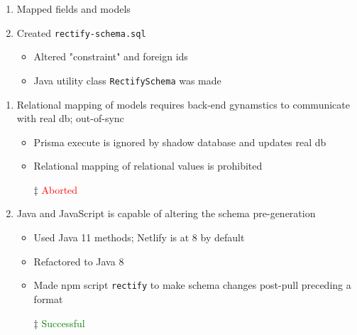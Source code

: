 \documentclass[7px]{article}
\begin{document}
\deploy
{
  \begin{enumerate}
    \item Mapped fields and models
    \item Created \texttt{rectify-schema.sql}
      \begin{itemize}
        \item Altered "constraint" and foreign ids
        \item Java utility class \texttt{RectifySchema} was made
      \end{itemize}
  \end{enumerate}
  \normalsize
}
{
  \begin{enumerate}
    \small
    \item Relational mapping of models requires back-end gynamstics to communicate with real db; out-of-sync
      \begin{itemize}[label=$\multimapinv$]
        \item Prisma execute is ignored by shadow database and updates real db
        \item Relational mapping of relational values is prohibited 
        \item[$\ddag$] \textcolor{red}{\footnotesize{Aborted}}
      \end{itemize}
    \item Java and JavaScript is capable of altering the schema pre-generation
      \begin{itemize}[label=$\multimapinv$]
        \item Used Java 11 methods; Netlify is at 8 by default
        \item Refactored to Java 8 
        \item Made npm script \texttt{rectify} to make schema changes post-pull preceding a format
        \item[$\ddag$] \textcolor{green}{\footnotesize{Successful}}
      \end{itemize}
  \end{enumerate}
}
\end{document}
